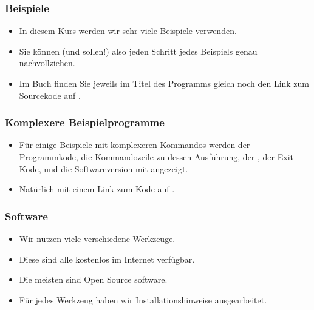 \documentclass[aspectratio=169,mathserif,notheorems]{beamer}%
\begin{document}
%
\begin{frame}[fragile,t]
\frametitle{Beispiele}%
\begin{itemize}%
\item In diesem Kurs werden wir sehr viele Beispiele verwenden.
\item<2-> Sie können (und sollen!) also jeden Schritt jedes Beispiels genau nachvollziehen.%
\item<3-> Im Buch finden Sie jeweils im Titel des Programms gleich noch den Link zum Sourcekode auf \github.%
\end{itemize}%
%
%
\end{frame}
%
\begin{frame}%
\frametitle{Komplexere Beispielprogramme}%
\parbox{0.435\linewidth}{%
\begin{itemize}%
\item Für einige Beispiele mit komplexeren Kommandos werden der Programmkode, die Kommandozeile zu dessen Ausführung, der \cite{J2024PTOGBSI8IS12E:SSSSIS}, der Exit-Kode\cite{J2024PTOGBSI8IS12E:TAP}, und die Softwareversion mit angezeigt.%
\item<2-> Natürlich mit einem Link zum Kode auf \github.%
\end{itemize}%
}%
%
\end{frame}%
%
\begin{frame}%
\frametitle{Software}%
\begin{itemize}%
\item Wir nutzen viele verschiedene Werkzeuge.%
\item<2-> Diese sind alle kostenlos im Internet verfügbar.%
\item<3-> Die meisten sind Open Source software.%
\item<4-> Für jedes Werkzeug haben wir Installationshinweise ausgearbeitet.%
\end{itemize}%
\end{frame}%
%
\end{document}

